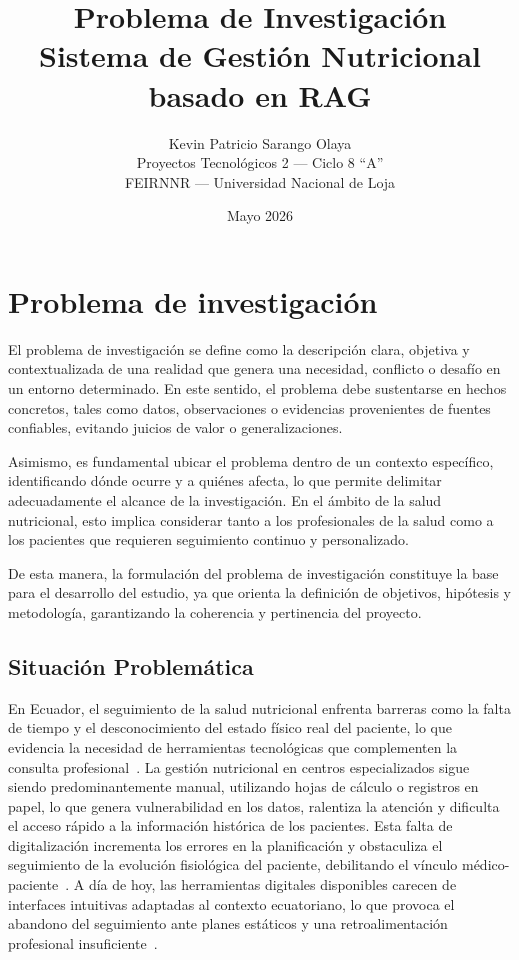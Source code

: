 \documentclass[12pt,a4paper]{article}
\title{\textbf{Problema de Investigación} \\
       \large Sistema de Gestión Nutricional basado en RAG}
\author{Kevin Patricio Sarango Olaya \\
        \small Proyectos Tecnológicos 2 --- Ciclo 8 ``A'' \\
        \small FEIRNNR --- Universidad Nacional de Loja}
\date{Mayo 2026}
\begin{document}
\maketitle
\clearpage

\section{Problema de investigación}

El problema de investigación se define como la descripción clara, objetiva y
contextualizada de una realidad que genera una necesidad, conflicto o desafío
en un entorno determinado. En este sentido, el problema debe sustentarse en
hechos concretos, tales como datos, observaciones o evidencias provenientes de
fuentes confiables, evitando juicios de valor o generalizaciones.

Asimismo, es fundamental ubicar el problema dentro de un contexto específico,
identificando dónde ocurre y a quiénes afecta, lo que permite delimitar
adecuadamente el alcance de la investigación. En el ámbito de la salud
nutricional, esto implica considerar tanto a los profesionales de la salud como
a los pacientes que requieren seguimiento continuo y personalizado.

De esta manera, la formulación del problema de investigación constituye la base
para el desarrollo del estudio, ya que orienta la definición de objetivos,
hipótesis y metodología, garantizando la coherencia y pertinencia del proyecto.

\subsection{Situación Problemática}

En Ecuador, el seguimiento de la salud nutricional enfrenta barreras como la
falta de tiempo y el desconocimiento del estado físico real del paciente, lo
que evidencia la necesidad de herramientas tecnológicas que complementen la
consulta profesional~\cite{vargas2025}. La gestión nutricional en centros
especializados sigue siendo predominantemente manual, utilizando hojas de
cálculo o registros en papel, lo que genera vulnerabilidad en los datos,
ralentiza la atención y dificulta el acceso rápido a la información histórica
de los pacientes. Esta falta de digitalización incrementa los errores en la
planificación y obstaculiza el seguimiento de la evolución fisiológica del
paciente, debilitando el vínculo médico-paciente~\cite{quichimbo2021}.
A día de hoy, las herramientas digitales disponibles carecen de interfaces
intuitivas adaptadas al contexto ecuatoriano, lo que provoca el abandono del
seguimiento ante planes estáticos y una retroalimentación profesional
insuficiente~\cite{vargas2025,quichimbo2021,siddiqui2025}.
\end{document}
